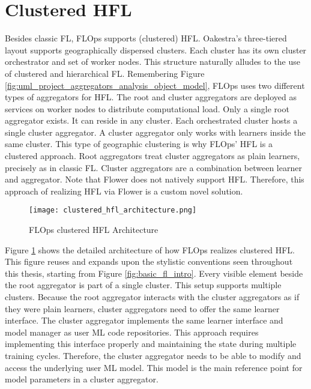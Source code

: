 \section{Clustered HFL}

Besides classic FL, FLOps supports (clustered) HFL.
Oakestra's three-tiered layout supports geographically dispersed clusters.
Each cluster has its own cluster orchestrator and set of worker nodes.
This structure naturally alludes to the use of clustered and hierarchical FL.
Remembering Figure \ref{fig:uml_project_aggregators_analysis_object_model}, FLOps uses two different types of aggregators for HFL.
The root and cluster aggregators are deployed as services on worker nodes to distribute computational load.
Only a single root aggregator exists.
It can reside in any cluster.
Each orchestrated cluster hosts a single cluster aggregator.
A cluster aggregator only works with learners inside the same cluster.
This type of geographic clustering is why FLOps' HFL is a clustered approach.
Root aggregators treat cluster aggregators as plain learners, precisely as in classic FL.
Cluster aggregators are a combination between learner and aggregator.
Note that Flower does not natively support HFL.
Therefore, this approach of realizing HFL via Flower is a custom novel solution.

\begin{figure}[p]
    \begin{adjustwidth}{-0.1\paperwidth}{-0.1\paperwidth}
        \centering
        \texttt{[image: clustered\_hfl\_architecture.png]}
        \caption{FLOps clustered HFL Architecture}
        \label{fig:flops_clustered_hfl_architecture}
    \end{adjustwidth}
\end{figure}
Figure \ref{fig:flops_clustered_hfl_architecture} shows the detailed architecture of how FLOps realizes clustered HFL.
This figure reuses and expands upon the stylistic conventions seen throughout this thesis, starting from Figure \ref{fig:basic_fl_intro}.
Every visible element beside the root aggregator is part of a single cluster.
This setup supports multiple clusters.
Because the root aggregator interacts with the cluster aggregators as if they were plain learners, cluster aggregators need to offer the same learner interface.
The cluster aggregator implements the same learner interface and model manager as user ML code repositories.
This approach requires implementing this interface properly and maintaining the state during multiple training cycles.
Therefore, the cluster aggregator needs to be able to modify and access the underlying user ML model.
This model is the main reference point for model parameters in a cluster aggregator.

